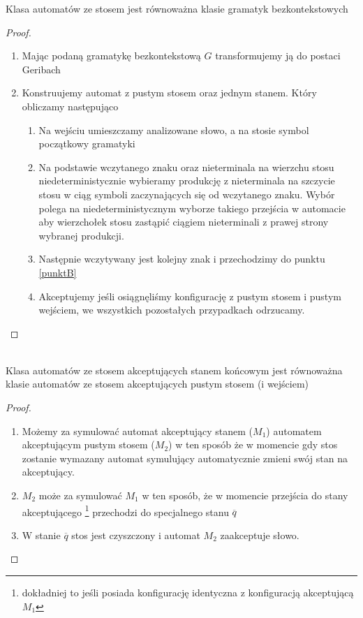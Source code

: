 \begin{tw}
	Klasa automatów ze stosem jest równoważna klasie gramatyk bezkontekstowych
	\begin{proof}
	\begin{enumerate}
		\item Mając podaną gramatykę bezkontekstową $G$ transformujemy ją do postaci Geribach
		\item Konstruujemy automat z pustym stosem oraz jednym stanem. Który obliczamy następująco
			\begin{enumerate}
				\item Na wejściu umieszczamy analizowane słowo, a na stosie symbol początkowy gramatyki
				\item Na podstawie wczytanego znaku oraz nieterminala na wierzchu stosu niedeterministycznie
				wybieramy produkcję z nieterminala na szczycie stosu w ciąg symboli zaczynających się
				od wczytanego znaku.
				Wybór polega na niedeterministycznym wyborze takiego przejścia w automacie aby wierzchołek
				stosu zastąpić ciągiem nieterminali z prawej strony wybranej produkcji. \label{punktB}
				\item Następnie wczytywany jest kolejny znak i przechodzimy do punktu \ref{punktB}
				\item Akceptujemy jeśli osiągnęliśmy konfigurację z pustym stosem i pustym wejściem, we
				wszystkich pozostałych przypadkach odrzucamy.
			\end{enumerate}
	\end{enumerate}		
	\end{proof}
\end{tw}

\begin{tw}~\\
	Klasa automatów ze stosem akceptujących stanem końcowym jest równoważna klasie automatów ze stosem
	akceptujących pustym stosem (i wejściem)
	\begin{proof}
		\begin{enumerate}
			\item Możemy za symulować automat akceptujący stanem ($M_1$) automatem akceptującym pustym stosem ($M_2$)
			w ten sposób że w momencie gdy stos zostanie wymazany automat
			symulujący automatycznie zmieni swój stan na akceptujący.
			\item $M_2$ może za symulować $M_1$ w ten sposób, że w momencie przejścia do stany akceptującego
			\footnote{dokładniej to jeśli posiada konfigurację identyczna z konfiguracją akceptującą $M_1$}
			przechodzi do specjalnego stanu $\overline{q}$
			\item W stanie $\overline{q}$ stos jest czyszczony i automat $M_2$ zaakceptuje słowo.
		\end{enumerate}
	\end{proof}
\end{tw}

